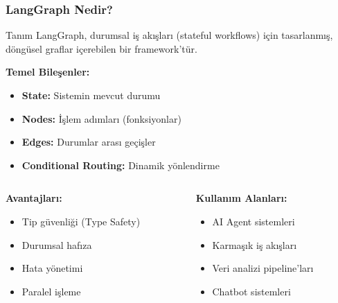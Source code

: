 \documentclass[aspectratio=169]{beamer}
\begin{document}
\begin{frame}
\frametitle{LangGraph Nedir?}
\begin{block}{Tanım}
LangGraph, durumsal iş akışları (stateful workflows) için tasarlanmış, döngüsel graflar içerebilen bir framework'tür.
\end{block}

\vspace{0.3cm}
\textbf{Temel Bileşenler:}
\begin{itemize}
    \item \textbf{State:} Sistemin mevcut durumu
    \item \textbf{Nodes:} İşlem adımları (fonksiyonlar)
    \item \textbf{Edges:} Durumlar arası geçişler
    \item \textbf{Conditional Routing:} Dinamik yönlendirme
\end{itemize}

\vspace{0.3cm}
\begin{columns}
\begin{column}{0.5\textwidth}
\textbf{Avantajları:}
\begin{itemize}
    \item Tip güvenliği (Type Safety)
    \item Durumsal hafıza
    \item Hata yönetimi
    \item Paralel işleme
\end{itemize}
\end{column}
\begin{column}{0.5\textwidth}
\textbf{Kullanım Alanları:}
\begin{itemize}
    \item AI Agent sistemleri
    \item Karmaşık iş akışları
    \item Veri analizi pipeline'ları
    \item Chatbot sistemleri
\end{itemize}
\end{column}
\end{columns}
\end{frame}
\end{document}
